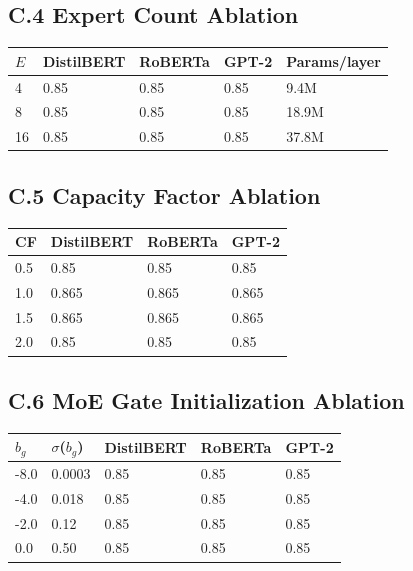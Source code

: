 \subsection{C.4 Expert Count Ablation}

\begin{table}[H]
\centering
\small
\begin{tabular}{lllll}
\toprule
\textbf{$E$} & \textbf{DistilBERT} & \textbf{RoBERTa} & \textbf{GPT-2} & \textbf{Params/layer} \\
\midrule
4 & 0.85 & 0.85 & 0.85 & 9.4M \\
8 & 0.85 & 0.85 & 0.85 & 18.9M \\
16 & 0.85 & 0.85 & 0.85 & 37.8M \\
\bottomrule
\end{tabular}
\end{table}

\subsection{C.5 Capacity Factor Ablation}

\begin{table}[H]
\centering
\small
\begin{tabular}{llll}
\toprule
\textbf{CF} & \textbf{DistilBERT} & \textbf{RoBERTa} & \textbf{GPT-2} \\
\midrule
0.5 & 0.85 & 0.85 & 0.85 \\
1.0 & 0.865 & 0.865 & 0.865 \\
1.5 & 0.865 & 0.865 & 0.865 \\
2.0 & 0.85 & 0.85 & 0.85 \\
\bottomrule
\end{tabular}
\end{table}

\subsection{C.6 MoE Gate Initialization Ablation}

\begin{table}[H]
\centering
\small
\begin{tabular}{lllll}
\toprule
\textbf{$b_g$} & \textbf{$\sigma$($b_g$)} & \textbf{DistilBERT} & \textbf{RoBERTa} & \textbf{GPT-2} \\
\midrule
-8.0 & 0.0003 & 0.85 & 0.85 & 0.85 \\
-4.0 & 0.018 & 0.85 & 0.85 & 0.85 \\
-2.0 & 0.12 & 0.85 & 0.85 & 0.85 \\
0.0 & 0.50 & 0.85 & 0.85 & 0.85 \\
\bottomrule
\end{tabular}
\end{table}

